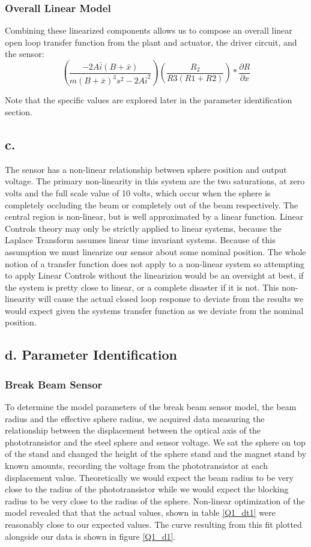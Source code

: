 \documentclass{article}
\theoremstyle{plain}
\theoremstyle{definition}
\theoremstyle{remark}
\begin{document}
\subsubsection*{Overall Linear Model}
Combining these linearized components allows us to compose an overall linear open loop transfer function from the plant and actuator, the driver circuit, and the sensor:
$$ \left(\frac{-2 A \bar{i} (B + \bar{x})}{m(B+\bar{x})^3 s^2 - 2 A \bar{i}^2}\right) \left(\frac{R_2}{R3(R1+R2)}\right)*\frac{\partial R}{\partial x} $$

Note that the specific values are explored later in the parameter identification section.

\subsection*{c.}
The sensor has a non-linear relationship between sphere position and output voltage.  The primary non-linearity in this system are the two saturations, at zero volts and the full scale value of 10 volts, which occur when the sphere is completely occluding the beam or completely out of the beam respectively.  The central region is non-linear, but is well approximated by a linear function.  Linear Controls theory may only be strictly applied to linear systems, because the Laplace Transform assumes linear time invariant systems.  Because of this assumption we must linearize our sensor about some nominal position.  The whole notion of a transfer function does not apply to a non-linear system so attempting to apply Linear Controls without the linearizion would be an oversight at best, if the system is pretty close to linear, or a complete disaster if it is not.  This non-linearity will cause the actual closed loop response to deviate from the results we would expect given the systems transfer function as we deviate from the nominal position.

\subsection*{d. Parameter Identification}

\subsubsection*{Break Beam Sensor}
To determine the model parameters of the break beam sensor model, the beam radius and the effective sphere radius, we acquired data measuring the relationship between the displacement between the optical axis of the phototransistor and the steel sphere and sensor voltage.  We sat the sphere on top of the stand and changed the height of the sphere stand and the magnet stand by known amounts, recording the voltage from the phototransistor at each displacement value.  Theoretically we would expect the beam radius to be very close to the radius of the phototransistor while we would expect the blocking radius to be very close to the radius of the sphere.  Non-linear optimization of the model revealed that that the actual values, shown in table \ref{Q1_dt1} were reasonably close to our expected values.  The curve resulting from this fit plotted alongside our data is shown in figure \ref{Q1_d1}.\\
\end{document}
